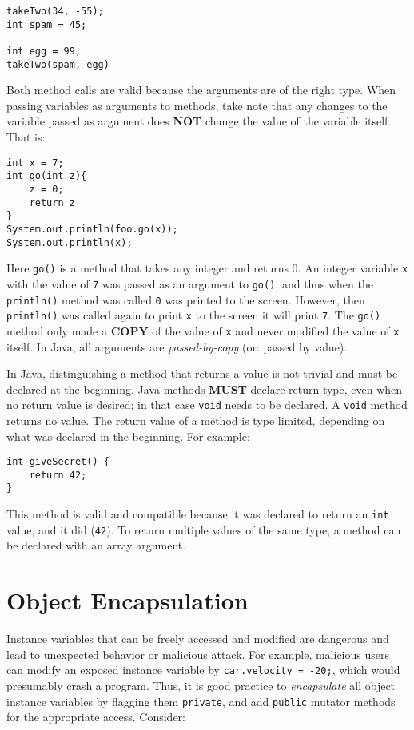 \documentclass{tufte-handout}
\begin{document}
    \begin{lstlisting}
takeTwo(34, -55);
int spam = 45;

int egg = 99;
takeTwo(spam, egg)
    \end{lstlisting}

    Both method calls are valid because the arguments are of the right type. When passing variables as arguments to methods, take note that any changes to the variable passed as argument does \textbf{NOT} change the value of the variable itself. That is:

    \begin{lstlisting}
int x = 7;
int go(int z){
    z = 0;
    return z
}
System.out.println(foo.go(x));
System.out.println(x);
    \end{lstlisting}

    Here \texttt{go()} is a method that takes any integer and returns 0. An integer variable \texttt{x} with the value of \texttt{7} was passed as an argument to \texttt{go()}, and thus when the \texttt{println()} method was called \texttt{0} was printed to the screen. However, then \texttt{println()} was called again to print \texttt{x} to the screen it will print \texttt{7}. The \texttt{go()} method only made a \textbf{COPY} of the value of \texttt{x} and never modified the value of \texttt{x} itself. In Java, all arguments are \emph{passed-by-copy} (or: passed by value). 

    In Java, distinguishing a method that returns a value is not trivial and must be declared at the beginning. Java methods \textbf{MUST} declare return type, even when no return value is desired; in that case \texttt{void} needs to be declared. A \texttt{void} method returns no value. The return value of a method is type limited, depending on what was declared in the beginning. For example:

    \begin{lstlisting}
int giveSecret() {
    return 42;
}
    \end{lstlisting}

    This method is valid and compatible because it was declared to return an \texttt{int} value, and it did (\texttt{42}). To return multiple values of the same type, a method can be declared with an array argument. 

    \section*{Object Encapsulation}
    Instance variables that can be freely accessed and modified are dangerous and lead to unexpected behavior or malicious attack. For example, malicious users can modify an exposed instance variable by \texttt{car.velocity = -20;}, which would presumably crash a program. Thus, it is good practice to \emph{encapsulate} all object instance variables by flagging them \texttt{private}, and add \texttt{public} mutator methods for the appropriate access. Consider:
\end{document}
